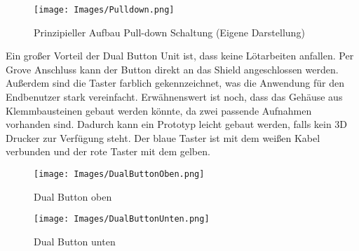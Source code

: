 \begin{figure}
    
    \begin{center}
        \texttt{[image: Images/Pulldown.png]} 
        \caption{Prinzipieller Aufbau Pull-down Schaltung (Eigene Darstellung)} 
    \end{center}
    
\end{figure}


Ein großer Vorteil der Dual Button Unit ist, dass keine Lötarbeiten anfallen. Per Grove Anschluss kann der Button direkt an das Shield angeschlossen werden. Außerdem sind die Taster farblich gekennzeichnet, was die Anwendung für den Endbenutzer stark vereinfacht. Erwähnenswert ist noch, dass das Gehäuse aus Klemmbausteinen gebaut werden könnte, da zwei passende Aufnahmen vorhanden sind. Dadurch kann ein Prototyp leicht gebaut werden, falls kein 3D Drucker zur Verfügung steht. Der blaue Taster ist mit dem weißen Kabel verbunden und der rote Taster mit dem gelben. \cite{DualButton} \\

\begin{figure}
    \begin{center}
        \texttt{[image: Images/DualButtonOben.png]}
        \caption{Dual Button oben \cite{DualButton}}
    \end{center}
\end{figure}


\begin{figure}
    \begin{center}
        \texttt{[image: Images/DualButtonUnten.png]}
        \caption{Dual Button unten \cite{DualButton}}
    \end{center}
\end{figure}


